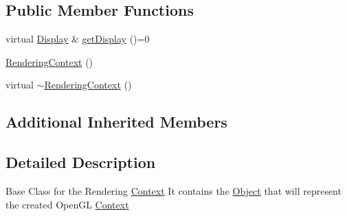 \subsection*{Public Member Functions}
\begin{DoxyCompactItemize}
\item 
virtual \hyperlink{classZeta_1_1Display}{Display} \& \hyperlink{classZeta_1_1RenderingContext_af56b7711c685f9e0331dbcf7b63ac73b}{get\+Display} ()=0
\item 
\hyperlink{classZeta_1_1RenderingContext_acd0164d241c5ee49dc50fae8f41c6696}{Rendering\+Context} ()
\item 
virtual \hyperlink{classZeta_1_1RenderingContext_a7959191a1b1c8717687a78f2a2517151}{$\sim$\+Rendering\+Context} ()
\end{DoxyCompactItemize}
\subsection*{Additional Inherited Members}


\subsection{Detailed Description}
Base Class for the Rendering \hyperlink{classZeta_1_1Context}{Context} It contains the \hyperlink{classZeta_1_1Object}{Object} that will represent the created Open\+G\+L \hyperlink{classZeta_1_1Context}{Context} 


